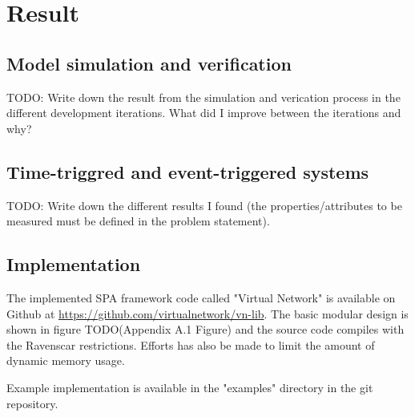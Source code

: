 \chapter{Result}\label{ch:result}
\section{Model simulation and verification}
TODO: Write down the result from the simulation and verication process in the
different development iterations. What did I improve between the iterations and
why?

\section{Time-triggred and event-triggered systems}
TODO: Write down the different results I found (the properties/attributes to be
measured must be defined in the problem statement).

\section{Implementation}
The implemented SPA framework code called "Virtual Network" is available on
Github at \url{https://github.com/virtualnetwork/vn-lib}. The basic modular
design is shown in figure TODO(Appendix A.1 Figure) and the source code
compiles with the Ravenscar restrictions. Efforts has also be made to limit the
amount of dynamic memory usage.

Example implementation is available in the "examples" directory in the git
repository.
